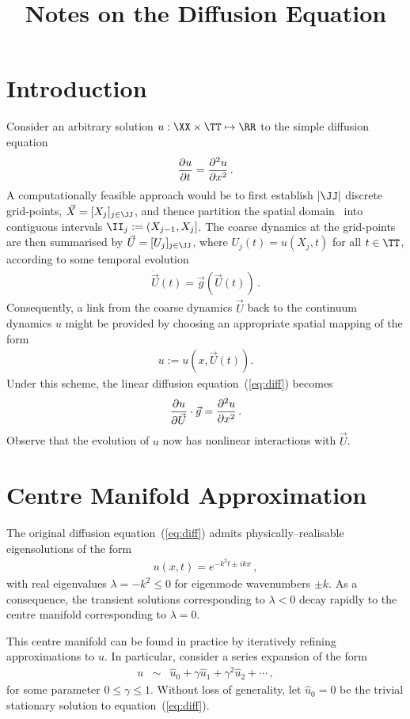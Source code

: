 \documentclass[12pt,a5paper]{article}
\title{Notes on the Diffusion Equation}
\begin{document}
\maketitle
\section{Introduction}
Consider an arbitrary solution $u:\XX\times \TT\mapsto \RR$ to the simple diffusion equation 
\begin{eqnarray}
	\D tu = \DD xu\,.
	\label{eq:diff}
\end{eqnarray}
A computationally feasible approach would be to 
first establish $|{\JJ}|$ discrete grid-points,
${\vec X}=[X_j]_{j\in\JJ}$, and thence
partition the spatial domain \XX\ into 
contiguous intervals \(\II_j:=(X_{j-1},X_j]\). 
The coarse dynamics at the grid-points are then summarised by
${\vec U}=[U_j]_{j\in\JJ}$, where $U_j(t)=u(X_j,t)$ for all $t\in \TT$, according to some temporal evolution
\begin{eqnarray}
	\dot{\vec U}(t) = {\vec g}({\vec U}(t))\,.
	\label{eq:temporal}
\end{eqnarray}
Consequently, a link from the coarse dynamics ${\vec U}$ back to the continuum dynamics $u$ might be provided
by choosing an appropriate spatial mapping of the form
\begin{eqnarray}
	u  := u(x,{\vec U}(t)).
	\label{eq:spatial}
\end{eqnarray}
Under this scheme, the linear diffusion equation~(\ref{eq:diff}) becomes
\begin{eqnarray}
	\D {\vec U}{u}\cdot{\vec g} = \DD x{u}\,.
	\label{eq:diff2}
\end{eqnarray}
Observe that the evolution of $u$ now has nonlinear interactions with ${\vec U}$.

\section{Centre Manifold Approximation}
The original diffusion equation~(\ref{eq:diff}) admits 
physically--realisable eigensolutions of the form
\begin{eqnarray}
	u(x,t)  = e^{-k^2 t\pm ikx}\,,
\label{eq:raw-eigmode}
\end{eqnarray}
with real eigenvalues $\lambda=-k^2\le 0$ for 
eigenmode wavenumbers $\pm k$. 
As a consequence, the transient solutions corresponding
to $\lambda<0$ decay rapidly to the centre manifold corresponding to $\lambda=0$. 

This centre manifold can be found in practice by iteratively refining approximations to $u$. In particular, consider a series expansion of the form
\begin{eqnarray}
	u  & \sim & \hat{u}_0+\gamma\hat{u}_1+\gamma^2\hat{u}_2+\cdots\,,
\end{eqnarray}
for some parameter $0\le\gamma\le 1$. Without loss of generality, let
$\hat{u}_0=0$ be the trivial stationary solution to equation~(\ref{eq:diff}). 
\end{document}
